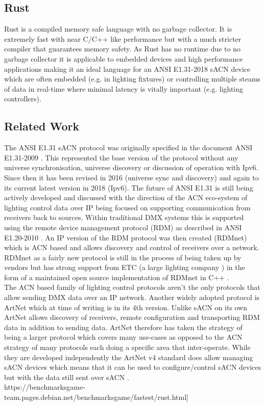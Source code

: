 \documentclass[11pt,a4paper]{report}
\begin{document}
\subsection{Rust}
Rust \cite{RUST_LANG} is a compiled memory safe language with no garbage collector. It is extremely fast with near C/C++ like performance \cite{RUST_C_COMPARISON} but with a much stricter compiler that guarantees memory safety. As Rust has no runtime due to no garbage collector it is applicable to embedded devices and high performance applications making it an ideal language for an ANSI E1.31-2018 sACN device which are often embedded (e.g. in lighting fixtures) or controlling multiple steams of data in real-time where minimal latency is vitally important (e.g. lighting controllers).
	
\subsection{Related Work}
The ANSI E1.31 sACN protocol was originally specified in the document ANSI E1.31-2009 \cite{ANSI_E1.31_2009}. This represented the base version of the protocol without any universe synchronisation, universe discovery or discussion of operation with Ipv6. Since then it has been revised in 2016 (universe sync and discovery) \cite{ANSI_E1.31_2016} and again to its current latest version in 2018 (Ipv6). The future of ANSI E1.31 is still being actively developed and discussed \cite{WHAT_COMES_AFTER_SACN} with the direction of the ACN eco-system of lighting control data over IP being focused on supporting communication from receivers back to sources. Within traditional DMX systems this is supported using the remote device management protocol (RDM) as described in ANSI E1.20-2010 \cite{ANSI_E1.20_2010}. An IP version of the RDM protocol was then created (RDMnet) \cite{ANSI_E1.33_2019} which is ACN based and allows discovery and control of receivers over a network. RDMnet as a fairly new protocol is still in the process of being taken up by vendors but has strong support from ETC (a large lighting company \cite{ETC}) in the form of a maintained open source implementation of RDMnet in C++ \cite{ANSI_E1.33_IMPL}.\\
	
The ACN based family of lighting control protocols aren't the only protocols that allow sending DMX data over an IP network. Another widely adopted protocol is ArtNet which at time of writing is in its 4th version. Unlike sACN on its own ArtNet allows discovery of receivers, remote configuration and transporting RDM data \cite{ARNET} in addition to sending data. ArtNet therefore has taken the strategy of being a larger protocol which covers many use-cases as opposed to the ACN strategy of many protocols each doing a specific area that inter-operate. While they are developed independently the ArtNet v4 standard does allow managing sACN devices which means that it can be used to configure/control sACN devices but with the data still sent over sACN \cite[Pg. 3]{ARTNET}. \\https://benchmarksgame-team.pages.debian.net/benchmarksgame/fastest/rust.html]
	
\end{document}
